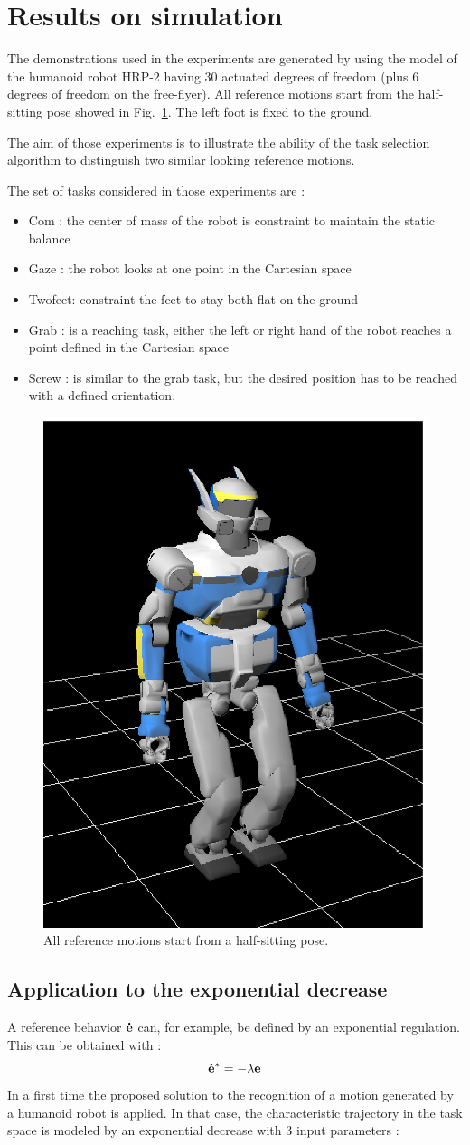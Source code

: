 \documentclass[letterpaper, 10pt, conference]{ieeeconf}      %
\begin{document}
\section{Results on simulation}
The demonstrations used in the experiments are generated by using the model
of the humanoid robot HRP-2 having 30 actuated degrees of freedom (plus 6 degrees of freedom on the
free-flyer). All reference motions start from the half-sitting pose showed in Fig.~\ref{fig:halfSit}.
The left foot is fixed to the ground.

The aim of those experiments is to illustrate the ability of the
task selection algorithm to distinguish two similar looking reference motions.

The set of tasks considered in those experiments are :

\begin{itemize}
\item Com : the center of mass of the robot is constraint to maintain the static balance
\item Gaze : the robot looks at one point in the Cartesian space
\item Twofeet: constraint the feet to stay both flat on the ground
\item Grab : is a reaching task, either the left or right hand
of the robot reaches a point defined in the Cartesian space
\item Screw : is similar to the grab task, but the desired position
has to be reached with a defined orientation.
\end{itemize}
\begin{figure}[t]
\begin{center}
\includegraphics[width=0.3\linewidth]{img/halfSit.ps}
\end{center}
\caption{All reference motions start from a half-sitting pose.}
\label{fig:halfSit}
\end{figure}

\subsection{Application to the exponential decrease}
A reference behavior ${\mathbf{\dot{e}}}$ can, for example, be defined by an exponential regulation. This can
be obtained with :
\begin{equation}
{\mathbf{\dot{e}}}^* = -\lambda {\mathbf{e}}
\end{equation}
In a first time the proposed solution to the recognition of a motion
generated by a humanoid robot is applied. In that case, the characteristic trajectory in the task
space is modeled by an
exponential decrease with 3 input parameters :
\end{document}
